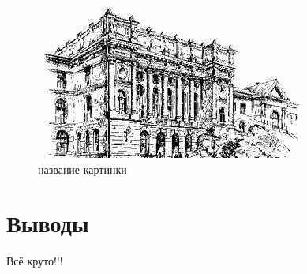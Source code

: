 \begin{figure}[H]
	\begin{center}
		\includegraphics[scale=0.7]{pics/spbpu.jpg}
		\caption{название картинки} 
		\label{pic:pic_name} %
	\end{center}
\end{figure}

\section*{Выводы}
Всё круто!!!


